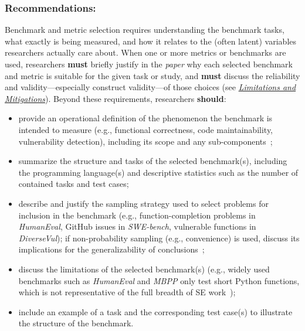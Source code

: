 \documentclass[smallextended]{svjour3}
\newcommand{\must}{\textbf{must}\xspace}
\newcommand{\should}{\textbf{should}\xspace}
\newcommand{\paper}{\emph{paper}\xspace}
\newcommand{\paper}{\emph{paper}\xspace}
\newcommand{\limitationsmitigations}{\hyperref[sec:report-limitations-and-mitigations]{\emph{Limitations and Mitigations}}\xspace}
\newcommand{\limitationsmitigations}{\href{/guidelines/limitations/}{\emph{Limitations and Mitigations}}\xspace}
\newcommand{\guidelinesubsubsection}[1]{\subsubsection{\bfseries #1:}}
\newcommand{\guidelinesubsubsection}[1]{\subsubsection{#1}}
\begin{document}
\guidelinesubsubsection{Recommendations}

Benchmark and metric selection requires understanding the benchmark tasks, what exactly is being measured, and how it relates to the (often latent) variables researchers actually care about. When one or more metrics or benchmarks are used, researchers \must briefly justify in the \paper why each selected benchmark and metric is suitable for the given task or study, and \must discuss the reliability and validity---especially construct validity---of those choices (see \limitationsmitigations). Beyond these requirements, researchers \should:
\begin{itemize}
    \item provide an operational definition of the phenomenon the benchmark is intended to measure (e.g., functional correctness, code maintainability, vulnerability detection), including its scope and any sub-components~\cite{bean2025measuring};
    \item summarize the structure and tasks of the selected benchmark(s), including the programming language(s) and descriptive statistics such as the number of contained tasks and test cases;
    \item describe and justify the sampling strategy used to select problems for inclusion in the benchmark (e.g., function-completion problems in \emph{HumanEval}, GitHub issues in \emph{SWE-bench}, vulnerable functions in \emph{DiverseVul}); if non-probability sampling (e.g., convenience) is used, discuss its implications for the generalizability of conclusions~\cite{DBLP:journals/ese/BaltesR22, bean2025measuring};
    \item discuss the limitations of the selected benchmark(s) (e.g., widely used benchmarks such as \emph{HumanEval} \cite{DBLP:journals/corr/abs-2107-03374} and \emph{MBPP} \cite{DBLP:journals/corr/abs-2108-07732} only test short Python functions, which is not representative of the full breadth of SE work~\cite{Chandra2025benchmarks});
    \item include an example of a task and the corresponding test case(s) to illustrate the structure of the benchmark.
\end{itemize}
\end{document}
